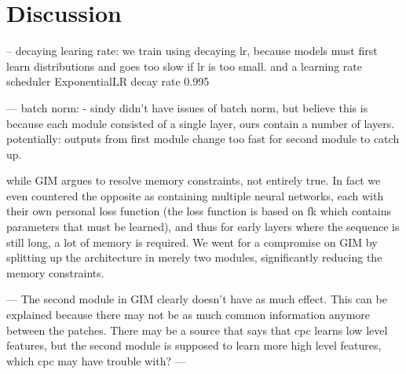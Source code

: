 \documentclass[]{book}
\begin{document}
\newcommand{\normalfatmusigma}[0]{\mathcal{N}(\mufat, \text{diag}(\sigmafat^2))}



\newcommand{\D}[0]{\mathcal{D}}
\newcommand{\X}[0]{\mathcal{X}}
\newcommand{\Z}[0]{\mathcal{Z}}
\newcommand{\Y}[0]{\mathcal{Y}}
\newcommand{\f}[0]{f(\cdot) }
\newcommand{\T}[0]{T(\cdot) }
\newcommand{\E}[0]{E(\cdot) }

\newcommand{\Dtrain}[0]{\D_{\text{train}}}

\newcommand{\xtith}[0]{\xt^{(i)}}
\newcommand{\xtjth}[0]{\xt^{(j)}}
\newcommand{\ztm}[0]{\zt^{m}}
\newcommand{\ztmnegone}[0]{\zt^{m-1}}

\newcommand{\MEL}[0]{\text{MEL}}







\chapter{Discussion}

-- 
decaying learing rate:
	we train using decaying lr, because models must first learn distributions and goes too slow if lr is too small.
	and a learning rate scheduler
	ExponentialLR
	decay rate 0.995

---
batch norm:
 - sindy didn't have issues of batch norm, but believe this is because each module consisted of a single layer, ours contain a number of layers. potentially: outputs from first module change too fast for second module to catch up.




while GIM argues to resolve memory constraints, not entirely true. In fact we even countered the opposite as containing multiple neural networks, each with their own personal loss function (the loss function is based on fk which contains parameters that must be learned), and thus for early layers where the sequence is still long, a lot of memory is required. We went for a compromise on GIM by splitting up the architecture in merely two modules, significantly reducing the memory constraints.


---
The second module in GIM clearly doesn't have as much effect. This can be explained because there may not be as much common information anymore between the patches. There may be a source that says that cpc learns low level features, but the second module is supposed to learn more high level features, which cpc may have trouble with?
---
\end{document}
